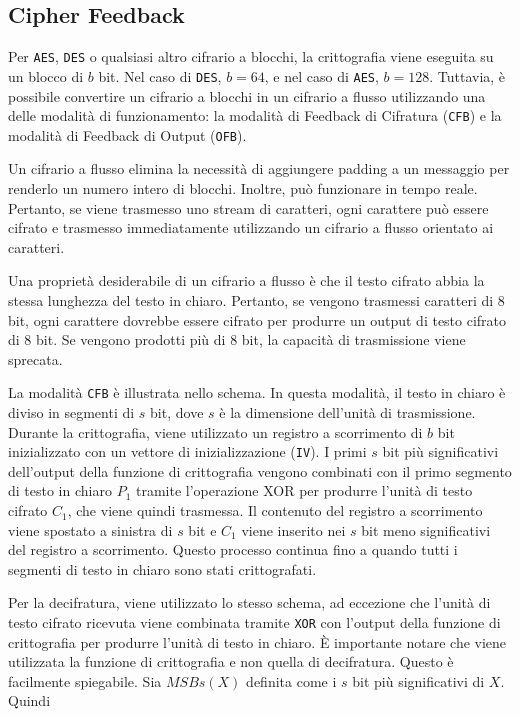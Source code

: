 \subsection{Cipher Feedback}
Per \verb|AES|, \verb|DES| o qualsiasi altro cifrario a blocchi, la crittografia viene eseguita
su un blocco di \(b\) bit. Nel caso di \verb|DES|, \(b = 64\), e nel caso di \verb|AES|,
\(b = 128\). Tuttavia, è possibile convertire un cifrario a blocchi in un cifrario
a flusso utilizzando una delle modalità di funzionamento: la modalità di
Feedback di Cifratura (\verb|CFB|) e la modalità di Feedback di Output (\verb|OFB|).

Un cifrario a flusso elimina la necessità di aggiungere padding a un messaggio
per renderlo un numero intero di blocchi. Inoltre, può funzionare in tempo reale.
Pertanto, se viene trasmesso uno stream di caratteri, ogni carattere può essere
cifrato e trasmesso immediatamente utilizzando un cifrario a flusso orientato
ai caratteri.

Una proprietà desiderabile di un cifrario a flusso è che il testo cifrato abbia
la stessa lunghezza del testo in chiaro. Pertanto, se vengono trasmessi caratteri
di $8$ bit, ogni carattere dovrebbe essere cifrato per produrre un output di
testo cifrato di $8$ bit. Se vengono prodotti più di $8$ bit, la capacità di
trasmissione viene sprecata.

La modalità \verb|CFB| è illustrata nello schema. In questa modalità, il testo in chiaro
è diviso in segmenti di \(s\) bit, dove \(s\) è la dimensione dell'unità di
trasmissione. Durante la crittografia, viene utilizzato un registro a scorrimento
di \(b\) bit inizializzato con un vettore di inizializzazione (\verb|IV|). I
primi \(s\) bit più significativi dell'output della funzione di crittografia
vengono combinati con il primo segmento di testo in chiaro \(P_1\) tramite
l'operazione XOR per produrre l'unità di testo cifrato \(C_1\), che viene quindi
trasmessa. Il contenuto del registro a scorrimento viene spostato a sinistra di
\(s\) bit e \(C_1\) viene inserito nei \(s\) bit meno significativi del registro
a scorrimento. Questo processo continua fino a quando tutti i segmenti di testo
in chiaro sono stati crittografati.

Per la decifratura, viene utilizzato lo stesso schema, ad eccezione che l'unità
di testo cifrato ricevuta viene combinata tramite \verb|XOR| con l'output della funzione
di crittografia per produrre l'unità di testo in chiaro. È importante notare che
viene utilizzata la funzione di crittografia e non quella di decifratura. Questo
è facilmente spiegabile. Sia \(MSBs(X)\) definita come i \(s\) bit più significativi
di \(X\). Quindi

